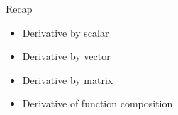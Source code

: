 \documentclass[12pt]{beamer}
\begin{document}
\begin{frame}{Recap}
\begin{itemize}
\item Derivative by scalar
\item Derivative by vector
\item Derivative by matrix
\item Derivative of function composition
\end{itemize}
\end{frame}
\end{document}
